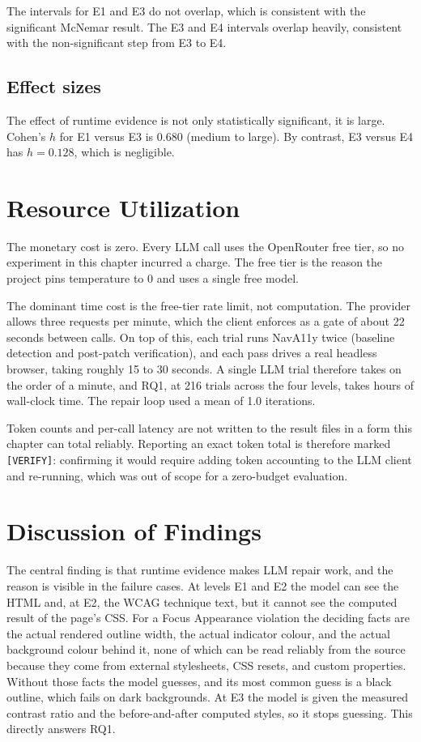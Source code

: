 \documentclass[11pt]{article}
\begin{document}
The intervals for E1 and E3 do not overlap, which is consistent with the significant
McNemar result. The E3 and E4 intervals overlap heavily, consistent with the
non-significant step from E3 to E4.

\subsection{Effect sizes}

The effect of runtime evidence is not only statistically significant, it is large.
Cohen's $h$ for E1 versus E3 is 0.680 (medium to large). By contrast, E3 versus E4 has
$h = 0.128$, which is negligible.

\section{Resource Utilization}

The monetary cost is zero. Every LLM call uses the OpenRouter free tier, so no
experiment in this chapter incurred a charge. The free tier is the reason the project
pins temperature to 0 and uses a single free model.

The dominant time cost is the free-tier rate limit, not computation. The provider
allows three requests per minute, which the client enforces as a gate of about 22
seconds between calls. On top of this, each trial runs NavA11y twice (baseline
detection and post-patch verification), and each pass drives a real headless browser,
taking roughly 15 to 30 seconds. A single LLM trial therefore takes on the order of a
minute, and RQ1, at 216 trials across the four levels, takes hours of wall-clock time.
The repair loop used a mean of 1.0 iterations.

Token counts and per-call latency are not written to the result files in a form this
chapter can total reliably. Reporting an exact token total is therefore marked
\texttt{[VERIFY]}: confirming it would require adding token accounting to the LLM
client and re-running, which was out of scope for a zero-budget evaluation.

\section{Discussion of Findings}

The central finding is that runtime evidence makes LLM repair work, and the reason is
visible in the failure cases. At levels E1 and E2 the model can see the HTML and, at
E2, the WCAG technique text, but it cannot see the computed result of the page's CSS.
For a Focus Appearance violation the deciding facts are the actual rendered outline
width, the actual indicator colour, and the actual background colour behind it, none
of which can be read reliably from the source because they come from external
stylesheets, CSS resets, and custom properties. Without those facts the model guesses,
and its most common guess is a black outline, which fails on dark backgrounds. At E3
the model is given the measured contrast ratio and the before-and-after computed
styles, so it stops guessing. This directly answers RQ1.
\end{document}
